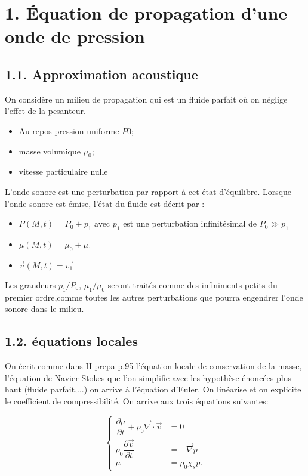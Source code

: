 \documentclass[french, a4paper, 10pt, twocolumn, landscape]{article}
\begin{document}
\section*{1. Équation de propagation d'une onde de pression}

\subsection*{1.1. Approximation acoustique}
On considère un milieu de propagation qui est un fluide parfait où on néglige l'effet de la pesanteur. 
\begin{itemize}
  \item Au repos pression uniforme $P0$;
  \item masse volumique $\mu_0$;
  \item vitesse particulaire nulle
\end{itemize}
L'onde sonore est une perturbation par rapport à cet état d'équilibre. Lorsque l'onde sonore est émise, l'état du fluide est décrit par : 

\begin{itemize}
  \item $P(M,t) = P_0+p_1$ avec $p_1$ est une perturbation infinitésimal de $P_0\gg p_1$
  \item $\mu(M,t) = \mu_0 +\mu_1$
  \item $\vec{v}(M,t) = \vec{v_1}$
\end{itemize}

Les grandeurs $p_1/P_0$, $\mu_1/\mu_0$ seront traités comme des infiniments petits du premier ordre,comme toutes les autres perturbations que pourra engendrer l'onde sonore dans le milieu.

\subsection*{1.2. équations locales}

On écrit comme dans H-prepa p.95 l'équation locale de conservation de la masse, l'équation de Navier-Stokes que l'on simplifie avec les hypothèse énoncées plus haut (fluide parfait,...) on arrive à l'équation d'Euler. On linéarise et on explicite le coefficient de compressibilité. On arrive aux trois équations suivantes:

\begin{equation}
  \left\{\begin{array}{ll}
    \dfrac{\partial \mu}{\partial t}+\rho_0\vec{\nabla}\cdot \vec{v} &= 0\\
    \rho_0\dfrac{\partial \vec{v}}{\partial t} &=-\vec{\nabla}p\\
    \mu &= \rho_0\chi_s p.
  \end{array}\right.
\end{equation}
\end{document}
